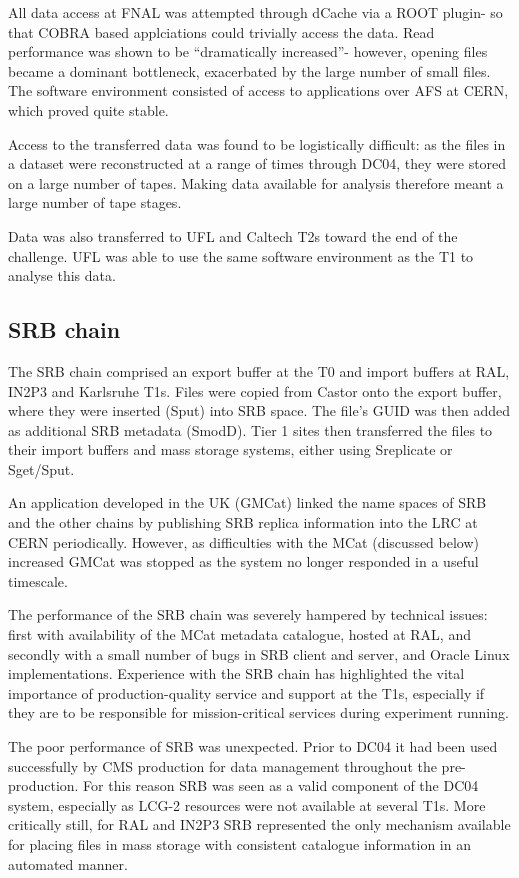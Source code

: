 \documentclass{cmspaper}
\begin{document}
All data access at FNAL was attempted through dCache via a ROOT
plugin- so that COBRA based applciations could trivially access the
data. Read performance was shown to be ``dramatically increased''-
however, opening files became a dominant bottleneck, exacerbated by
the large number of small files. The software environment consisted of
access to applications over AFS at CERN, which proved quite stable.

Access to the transferred data was found to be logistically difficult:
as the files in a dataset were reconstructed at a range of times
through DC04, they were stored on a large number of tapes. Making data
available for analysis therefore meant a large number of tape stages.

Data was also transferred to UFL and Caltech T2s toward the end of the
challenge. UFL was able to use the same software environment as the T1
to analyse this data.

\subsection{SRB chain}
The SRB chain comprised an export buffer at the T0 and import buffers at RAL, IN2P3 and Karlsruhe T1s. Files were copied from Castor onto the export buffer, where they were inserted (Sput) into SRB space. The file's GUID was then added as additional SRB metadata (SmodD). Tier 1 sites then transferred the files to their import buffers and mass storage systems, either using Sreplicate or Sget/Sput.

An application developed in the UK (GMCat) linked the name spaces of SRB and the other chains by publishing SRB replica information into the LRC at CERN periodically. However, as difficulties with the MCat (discussed below) increased GMCat was stopped as the system no longer responded in a useful timescale.

The performance of the SRB chain was severely hampered by technical issues: first with availability of the MCat metadata catalogue, hosted at RAL, and secondly with a small number of bugs in SRB client and server, and Oracle Linux implementations. Experience with the SRB chain has highlighted the vital importance of production-quality service and support at the T1s, especially if they are to be responsible for mission-critical services during experiment running.

The poor performance of SRB was unexpected. Prior to DC04 it had been used successfully by CMS production for data management throughout the pre-production.
For this reason SRB was seen as a valid component of the DC04 system, especially as LCG-2 resources were not available at several T1s. 
More critically still, for RAL and IN2P3 SRB represented the only mechanism available for placing files in mass storage with consistent catalogue information in an automated manner.
\end{document}
